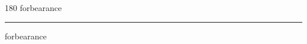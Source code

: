 
\begin{frame}
\begin{center}
\begin{turn}{180}
{\fontsize{2.5cm}{1em}\selectfont forbearance}
\end{turn}
\vspace{1em}\par  
\hrule
\vspace{1em}\par  
{\fontsize{2.5cm}{1em}\selectfont forbearance}
\end{center}
\end{frame}
